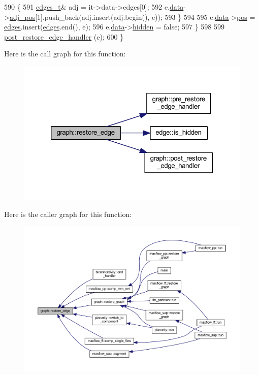 \begin{DoxyCode}
590     \{
591         \mbox{\hyperlink{edge_8h_a8f9587479bda6cf612c103494b3858e3}{edges\_t}}& adj = it->data->edges[0];
592         e.\mbox{\hyperlink{classedge_a0ebb6dfa28b77f47529085049352b436}{data}}->\mbox{\hyperlink{classedge__data_aa325caa449576727df8042bad875bf43}{adj\_pos}}[1].push\_back(adj.insert(adj.begin(), e));
593     \}
594     
595     e.\mbox{\hyperlink{classedge_a0ebb6dfa28b77f47529085049352b436}{data}}->\mbox{\hyperlink{classedge__data_a178a8fd40a6ec8139291f96a7807f711}{pos}} = \mbox{\hyperlink{classgraph_ab5b1c610cca1bcf72b05aacc28a48153}{edges}}.insert(\mbox{\hyperlink{classgraph_ab5b1c610cca1bcf72b05aacc28a48153}{edges}}.end(), e);
596     e.\mbox{\hyperlink{classedge_a0ebb6dfa28b77f47529085049352b436}{data}}->\mbox{\hyperlink{classedge__data_af8dc68051e5fe3336aa31ae1f3e104c3}{hidden}} = \textcolor{keyword}{false};
597     \}    
598     
599     \mbox{\hyperlink{classgraph_adfc71011ae82f047c550eba6d9e7bb3a}{post\_restore\_edge\_handler}} (e);
600 \}
\end{DoxyCode}
Here is the call graph for this function\+:
\nopagebreak
\begin{figure}[H]
\begin{center}
\leavevmode
\includegraphics[width=320pt]{classgraph_a2e5426682a0897b9f9104b019970bedc_cgraph}
\end{center}
\end{figure}
Here is the caller graph for this function\+:
\nopagebreak
\begin{figure}[H]
\begin{center}
\leavevmode
\includegraphics[width=350pt]{classgraph_a2e5426682a0897b9f9104b019970bedc_icgraph}
\end{center}
\end{figure}
